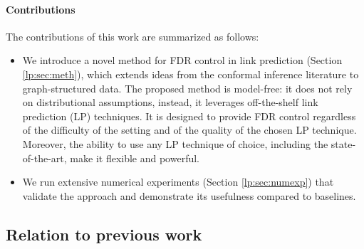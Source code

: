 \documentclass[a4paper, 11pt]{article}
\theoremstyle{remark}
\begin{document}
\paragraph{Contributions} The contributions of this work are summarized as follows: 

\begin{itemize}
\item We introduce a novel method for FDR control in link prediction (Section \ref{lp:sec:meth}), which extends ideas from the conformal inference literature to graph-structured data. The proposed method is model-free: it does not rely on distributional assumptions, instead, it leverages off-the-shelf link prediction (LP) techniques. It is designed to provide FDR control regardless of the difficulty of the setting and of the quality of the chosen LP technique. Moreover, the ability to use any LP technique of choice, including the state-of-the-art, make it flexible and powerful. 
\item We run extensive numerical experiments (Section \ref{lp:sec:numexp}) that validate the approach and demonstrate its usefulness compared to baselines.  
\end{itemize}


\subsection{Relation to previous work}
\end{document}
